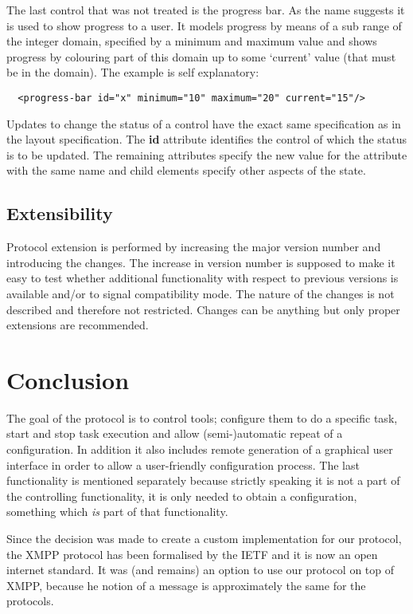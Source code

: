\documentclass{article}
\begin{document}
   The last control that was not treated is the progress bar. As the name
   suggests it is used to show progress to a user. It models progress by means
   of a sub range of the integer domain, specified by a minimum and maximum
   value and shows progress by colouring part of this domain up to some
   `current' value (that must be in the domain). The example is self
   explanatory:

    \begin{verbatim}
  <progress-bar id="x" minimum="10" maximum="20" current="15"/>\end{verbatim}

   Updates to change the status of a control have the exact same specification
   as in the layout specification. The \textbf{id} attribute identifies the
   control of which the status is to be updated. The remaining attributes
   specify the new value for the attribute with the same name and child
   elements specify other aspects of the state.

  \subsection{Extensibility}

   Protocol extension is performed by increasing the major version number and
   introducing the changes. The increase in version number is supposed to make
   it easy to test whether additional functionality with respect to previous
   versions is available and/or to signal compatibility mode. The nature of the
   changes is not described and therefore not restricted. Changes can be
   anything but only proper extensions are recommended.

  \section{Conclusion}

   The goal of the protocol is to control tools; configure them to do a
   specific task, start and stop task execution and allow (semi-)automatic
   repeat of a configuration. In addition it also includes remote generation of
   a graphical user interface in order to allow a user-friendly configuration
   process. The last functionality is mentioned separately because strictly
   speaking it is not a part of the controlling functionality, it is only
   needed to obtain a configuration, something which \emph{is} part of that
   functionality.

   Since the decision was made to create a custom implementation for our
   protocol, the XMPP protocol has been formalised by the IETF and it is now an
   open internet standard. It was (and remains) an option to use our protocol
   on top of XMPP, because he notion of a message is approximately the same for
   the protocols.
   
\end{document}
